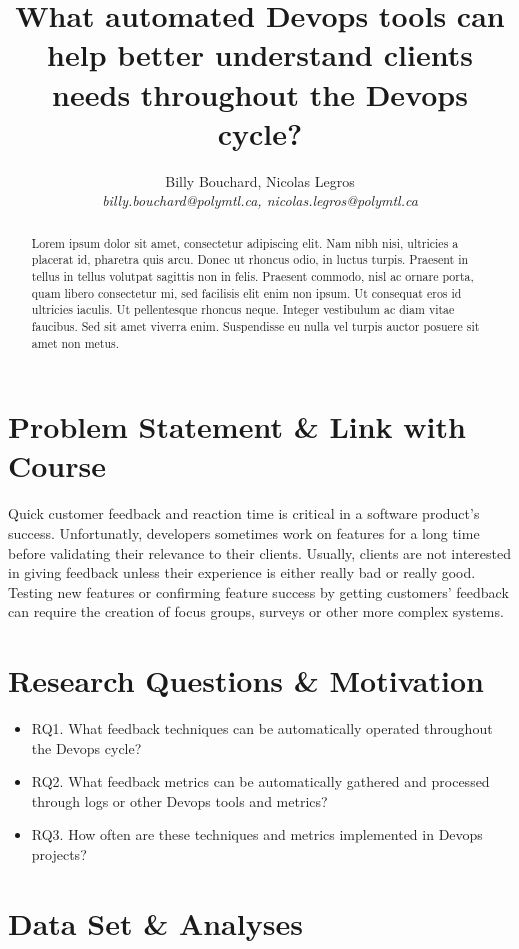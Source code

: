 \documentclass[10pt, conference]{IEEEtran}
\title{What automated Devops tools can help better understand clients needs 
  throughout the Devops cycle?}
\author{Billy Bouchard, Nicolas Legros    \\
    \emph{billy.bouchard@polymtl.ca, nicolas.legros@polymtl.ca}}
\begin{document}
\maketitle

\begin{abstract}
Lorem ipsum dolor sit amet, consectetur adipiscing elit. Nam nibh nisi, ultricies a placerat id, pharetra quis arcu. Donec ut rhoncus odio, in luctus turpis. Praesent in tellus in tellus volutpat sagittis non in felis. Praesent commodo, nisl ac ornare porta, quam libero consectetur mi, sed facilisis elit enim non ipsum. Ut consequat eros id ultricies iaculis. Ut pellentesque rhoncus neque. Integer vestibulum ac diam vitae faucibus. Sed sit amet viverra enim. Suspendisse eu nulla vel turpis auctor posuere sit amet non metus.
\end{abstract}

\section{Problem Statement \& Link with Course}
\label{sec:statement}

Quick customer feedback and reaction time is critical in a software product’s 
success. Unfortunatly, developers sometimes work on features for a long time 
before validating their relevance to their clients. Usually, clients are not 
interested in giving feedback unless their experience is either really bad or 
really good. Testing new features or confirming feature success by getting 
customers' feedback can require the creation of focus groups, surveys or 
other more complex systems. 


\section{Research Questions \& Motivation}
\label{sec:research-idea}
\begin{itemize}
  \item RQ1. What feedback techniques can be automatically operated throughout the Devops cycle?
  \item RQ2. What feedback metrics can be automatically gathered and processed through logs or other Devops tools and metrics?
  \item RQ3. How often are these techniques and metrics implemented in Devops projects?

\end{itemize}


\section{Data Set \& Analyses}
\label{sec:backgr-relat-work}
\end{document}
